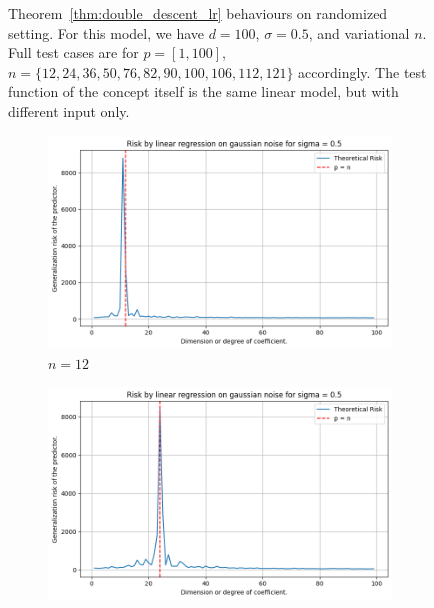 \documentclass{article}
\begin{document}
\begin{figure}[htb]
  \caption{Theorem~\ref{thm:double_descent_lr} behaviours on randomized setting. For this model, we have $d=100$, $\sigma = 0.5$, and variational $n$. Full test cases are for $p=[1,100]$, $n=\{12,24,36,50,76,82,90,100,106,112,121\}$ accordingly. The test function of the concept itself is the same linear model, but with different input only.}
  \label{fig:11grid}
\end{figure}

\begin{figure}[htb]
  \centering
  \newcommand{\imgwidth}{0.22\textwidth}

  \begin{subfigure}[b]{\imgwidth}
    \includegraphics[width=\linewidth]{img/descent_devel1.png}
    \caption{$n=12$}\label{fig:1a2}
  \end{subfigure}%
  \hfill
  \begin{subfigure}[b]{\imgwidth}
    \includegraphics[width=\linewidth]{img/descent_devel2.png}

\end{subfigure}
\end{figure}
\end{document}
